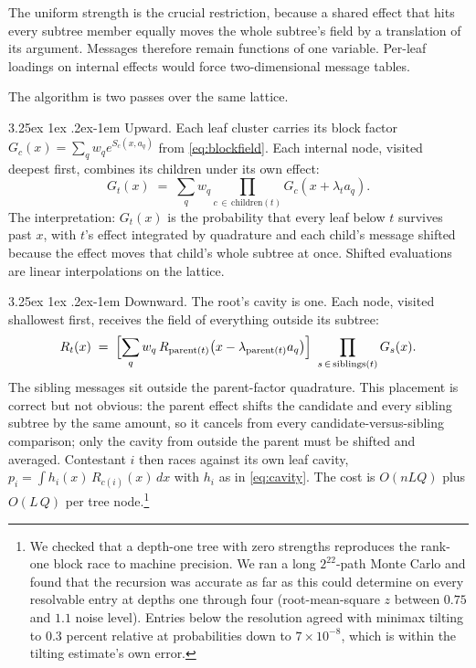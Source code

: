 \documentclass[11pt]{article}
\makeatletter
\renewcommand\paragraph{\@startsection{paragraph}{4}{\z@}%
  {3.25ex \@plus1ex \@minus.2ex}{-1em}%
  {\normalfont\normalsize\itshape}}
\makeatother
\begin{document}
The uniform strength is the crucial restriction,
because a shared effect that hits every subtree member equally moves the whole
subtree's field by a translation of its argument. Messages therefore remain
functions of one variable. Per-leaf loadings on internal effects would force
two-dimensional message tables.

The algorithm is two passes over the same lattice.

\paragraph{Upward.} Each leaf cluster carries its block factor
$G_c(x)=\sum_q w_q e^{S_c(x,a_q)}$ from \eqref{eq:blockfield}. Each internal
node, visited deepest first, combines its children under its own effect:
\begin{equation}\label{eq:up}
G_t(x)\;=\;\sum_q w_q \prod_{c\,\in\,\mathrm{children}(t)} G_c\!\left(x+\lambda_t
a_q\right).
\end{equation}
The interpretation: $G_t(x)$ is the probability that every leaf below $t$ survives past
$x$, with $t$'s effect integrated by quadrature and each child's message shifted
because the effect moves that child's whole subtree at once. Shifted evaluations
are linear interpolations on the lattice.

\paragraph{Downward.} The root's cavity is one. Each node, visited shallowest
first, receives the field of everything outside its subtree:
\begin{equation}\label{eq:down}
R_t(x)\;=\;\Bigl[\sum_q w_q\,R_{\mathrm{parent}(t)}\!\left(x-\lambda_{\mathrm{parent}(t)}
a_q\right)\Bigr]\ \prod_{s\,\in\,\mathrm{siblings}(t)} G_s(x).
\end{equation}
The sibling messages sit outside the parent-factor quadrature. This
placement is correct but not obvious: the parent effect shifts the
candidate and every sibling subtree by the same amount, so it cancels
from every candidate-versus-sibling comparison; only the cavity from
outside the parent must be shifted and averaged. Contestant $i$ then races against its own leaf cavity,
$p_i=\int h_i(x)\,R_{c(i)}(x)\,dx$ with $h_i$ as in \eqref{eq:cavity}. The cost
is $O(nLQ)$ plus $O(L\,Q)$ per tree node.\footnote{We checked that a depth-one tree with zero strengths reproduces the rank-one block race to machine
precision. We ran a long $2^{22}$-path Monte Carlo and found that the recursion was
accurate as far as this could determine on every resolvable
entry at depths one through four (root-mean-square $z$ between $0.75$ and
$1.1$ noise level). Entries below the resolution agreed with minimax tilting
\citep{botev2017} to $0.3$ percent relative at probabilities down to
$7\times10^{-8}$, which is within the tilting estimate's own error.}
\end{document}
